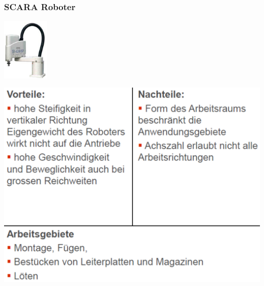 \begin{minipage}{0.33\linewidth}
    \subsubsection{SCARA Roboter}
    \includegraphics[height=3cm]{./bilder/ScaraRoboBsp}
    
    \includegraphics[width=\linewidth]{./bilder/ScaraRobo}
\end{minipage}
